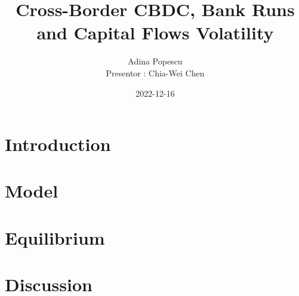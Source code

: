 \documentclass{beamer}
\title{Cross-Border CBDC, Bank Runs and Capital Flows Volatility}
\author{Adina Popescu \\ \small Presentor : Chia-Wei Chen }
\date{2022-12-16}
\begin{document}
    \begin{frame}
        
        \maketitle
    
    \end{frame}


    \section{Introduction}
    

    \section{Model}
    

    \section{Equilibrium}
    

    \section{Discussion}
    
\end{document}
